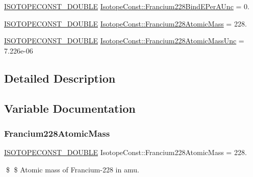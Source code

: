 \begin{DoxyCompactItemize}
\mbox{\hyperlink{group___isotope_const-_macros_ga8f45a7272ce02c0b4c65c44636ed719a}{I\+S\+O\+T\+O\+P\+E\+C\+O\+N\+S\+T\+\_\+\+D\+O\+U\+B\+LE}} \mbox{\hyperlink{group___isotope_const-_francium-_fr228_gaa80751c6a594f9ebefc91ee593d34b1a}{Isotope\+Const\+::\+Francium228\+Bind\+E\+Per\+A\+Unc}} = 0.
\item 
\mbox{\hyperlink{group___isotope_const-_macros_ga8f45a7272ce02c0b4c65c44636ed719a}{I\+S\+O\+T\+O\+P\+E\+C\+O\+N\+S\+T\+\_\+\+D\+O\+U\+B\+LE}} \mbox{\hyperlink{group___isotope_const-_francium-_fr228_gae9fa13a4ab58dcf55f8e649d61ee1297}{Isotope\+Const\+::\+Francium228\+Atomic\+Mass}} = 228.
\item 
\mbox{\hyperlink{group___isotope_const-_macros_ga8f45a7272ce02c0b4c65c44636ed719a}{I\+S\+O\+T\+O\+P\+E\+C\+O\+N\+S\+T\+\_\+\+D\+O\+U\+B\+LE}} \mbox{\hyperlink{group___isotope_const-_francium-_fr228_gab89fbe17844c3b4ce434339f29257f1c}{Isotope\+Const\+::\+Francium228\+Atomic\+Mass\+Unc}} = 7.\+226e-\/06
\end{DoxyCompactItemize}


\subsection{Detailed Description}


\subsection{Variable Documentation}
\mbox{\label{group___isotope_const-_francium-_fr228_gae9fa13a4ab58dcf55f8e649d61ee1297}} 
\subsubsection{\texorpdfstring{Francium228\+Atomic\+Mass}{Francium228AtomicMass}}
{\footnotesize\ttfamily \mbox{\hyperlink{group___isotope_const-_macros_ga8f45a7272ce02c0b4c65c44636ed719a}{I\+S\+O\+T\+O\+P\+E\+C\+O\+N\+S\+T\+\_\+\+D\+O\+U\+B\+LE}} Isotope\+Const\+::\+Francium228\+Atomic\+Mass = 228.}

\$ \$ Atomic mass of Francium-\/228 in amu. \mbox{\label{group___isotope_const-_francium-_fr228_gab89fbe17844c3b4ce434339f29257f1c}} 
